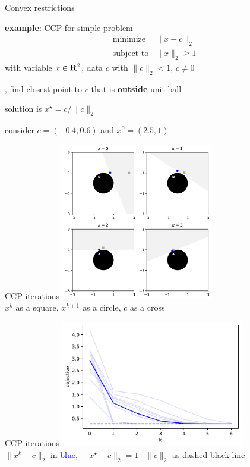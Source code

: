 \documentclass[aspectratio=169,11pt]{beamer}
\begin{document}
\begin{frame}{Convex restrictions}
\BIT
\item \textbf{example}: CCP for simple problem
\[
\begin{array}{ll}
\mbox{minimize} & \|x - c\|_2 \\
\mbox{subject to} & \|x\|_2 \geq 1
\end{array}
\]
with variable $x \in {\mbox{\bfseries\rmfamily R}}^2$, data $c$ with $\|c\|_2 < 1$, $c \neq 0$
\item \ie, find closest point to $c$ that is \textbf{outside} unit ball
\item solution is $x^\star = c/\|c\|_2$
\item consider $c = (-0.4, 0.6)$ and $x^0 = (2.5, 1)$
\EIT
\end{frame}

\begin{frame}{CCP iterations}
\centering
\includegraphics[width=0.5\textwidth]{convex_restriction_iterations.pdf} \\
$x^k$ as a square, $x^{k+1}$ as a circle, $c$ as a cross
\end{frame}

\begin{frame}{CCP iterations}
\centering
\includegraphics[width=0.6\textwidth]{convex_restriction_iterations_value.pdf} \\
$\|x^k - c\|_2$ in \textcolor{blue}{blue},
$\|x^\star - c\|_2 = 1-\|c\|_2$ as dashed black line
\end{frame}
\end{document}
